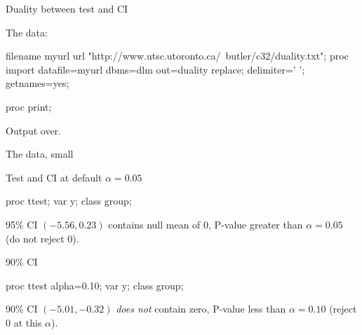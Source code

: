 \documentclass[unknownkeysallowed]{beamer}\usepackage[]{graphicx}\usepackage[]{color}
\begin{document}
\begin{frame}[fragile]{Duality between test and CI}
  
    The data:
    
  \begin{Datastep}
filename myurl url 
  "http://www.utsc.utoronto.ca/~butler/c32/duality.txt";    
proc import
  datafile=myurl
    dbms=dlm
    out=duality
    replace;
  delimiter=' ';
  getnames=yes;
  \end{Datastep}
  \begin{Sascode}[store=it]
proc print;
  \end{Sascode}
  Output over.

  
\end{frame}

\begin{frame}[fragile]{The data, small}
  
  
\end{frame}

\begin{frame}[fragile]{Test and CI at default $\alpha=0.05$}
  
  \begin{Sascode}[store=iu]
    proc ttest;
      var y;
      class group;
  \end{Sascode}
  
  
  95\% CI $(-5.56,0.23)$ contains null mean of 0, P-value greater than
  $\alpha=0.05$ (do not reject 0).
  
\end{frame}

\begin{frame}[fragile]{90\% CI}
  
  \begin{Sascode}[store=iva]
    proc ttest alpha=0.10;
      var y;
      class group;
  \end{Sascode}
  
  
  90\% CI $(-5.01,-0.32)$ \emph{does not} contain zero, P-value less
  than $\alpha=0.10$ (reject 0 at this $\alpha$).
  
\end{frame}
\end{document}
